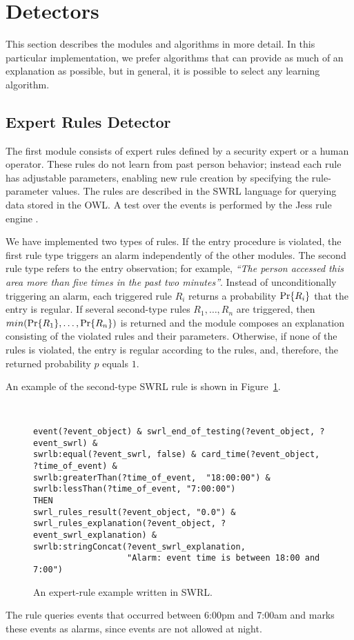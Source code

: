 \section{Detectors}
\label{sec:modules}

This section describes the modules and algorithms in more detail. In this particular implementation, we prefer algorithms that can provide as much of an explanation as possible, but in general, it is possible to select any learning algorithm.


\subsection{Expert Rules Detector}
\label{sec:modules:rules}

The first module consists of expert rules defined by a security expert or a human operator. These rules do not learn from past person behavior; instead each rule has adjustable parameters, enabling new rule creation by specifying the rule-parameter values. 
The rules are described in the SWRL language \citep{W3Cswrl} for querying data stored in the OWL. A test over the events is performed by the Jess rule engine \citep{Jess}. 

We have implemented two types of rules. If the entry procedure is violated, the first rule type triggers an alarm independently of the other modules. The second rule type refers to the entry observation; for example, \textit{``The person accessed this area more than five times in the past two minutes''}. Instead of unconditionally triggering an alarm, each triggered rule $R_i$ returns a probability $\text{Pr}\{R_i\}$ that the entry is regular. If several second-type rules $R_1, \dots, R_n$ are triggered, then $min(\text{Pr}\{R_1\}, \dots, \text{Pr}\{R_n\})$ is returned and the module composes an explanation consisting of the violated rules and their parameters. Otherwise, if none of the rules is violated, the entry is regular according to the rules, and, therefore, the returned probability $p$ equals $1$.

An example of the second-type SWRL rule is shown in Figure~\ref{fig:SWRL}.
\begin{figure}[]
\centering
\begin{verbatim}


event(?event_object) & swrl_end_of_testing(?event_object, ?event_swrl) &
swrlb:equal(?event_swrl, false) & card_time(?event_object, ?time_of_event) &
swrlb:greaterThan(?time_of_event,  "18:00:00") &
swrlb:lessThan(?time_of_event, "7:00:00")
THEN
swrl_rules_result(?event_object, "0.0") &
swrl_rules_explanation(?event_object, ?event_swrl_explanation) &
swrlb:stringConcat(?event_swrl_explanation, 
                   "Alarm: event time is between 18:00 and 7:00")
\end{verbatim}
\caption{An expert-rule example written in SWRL.}
\label{fig:SWRL}
\end{figure}
The rule queries events that occurred between 6:00pm and 7:00am and marks these events as alarms, since events are not allowed at night.



